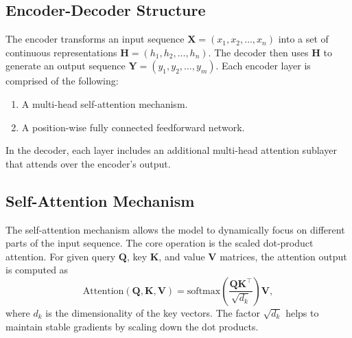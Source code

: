 \subsection{Encoder-Decoder Structure}

The encoder transforms an input sequence $\mathbf{X}=(x_1,x_2,\ldots,x_n)$ into a set of continuous representations $\mathbf{H}=(h_1,h_2,\ldots,h_n)$. The decoder then uses $\mathbf{H}$ to generate an output sequence $\mathbf{Y}=(y_1,y_2,\ldots,y_m)$. Each encoder layer is comprised of the following:
\begin{enumerate}
  \item A multi-head self-attention mechanism.
  \item A position-wise fully connected feedforward network.
\end{enumerate}
In the decoder, each layer includes an additional multi-head attention sublayer that attends over the encoder's output.

\subsection{Self-Attention Mechanism}

The self-attention mechanism allows the model to dynamically focus on different parts of the input sequence. The core operation is the scaled dot-product attention. For given query $\mathbf{Q}$, key $\mathbf{K}$, and value $\mathbf{V}$ matrices, the attention output is computed as
\begin{equation}
  \text{Attention}(\mathbf{Q},\mathbf{K},\mathbf{V})=\text{softmax}\left(\frac{\mathbf{Q}\mathbf{K}^\intercal}{\sqrt{d_k}}\right)\mathbf{V},
\end{equation}\label{eq:attention}
where $d_k$ is the dimensionality of the key vectors. The factor $\sqrt{d_k}$ helps to maintain stable gradients by scaling down the dot products.

